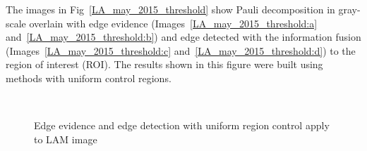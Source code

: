\documentclass[remotesensing,article,submit,pdftex,moreauthors]{Definitions/mdpi}
\begin{document}
The images in Fig~\eqref{LA_may_2015_threshold} show Pauli decomposition in gray-scale overlain     
with edge evidence (Images~\eqref{LA_may_2015_threshold:a} and~\eqref{LA_may_2015_threshold:b}) and edge detected with the information fusion (Images~\eqref{LA_may_2015_threshold:c} and~\eqref{LA_may_2015_threshold:d}) to the region of interest (ROI). The results shown in this figure were built using methods with uniform control regions.
  \begin{figure}[hbt]
	\centering
     \\
     \caption{Edge evidence and edge detection with uniform region control apply to LAM image}
     \label{LA_may_2015_threshold} 
   \end{figure}   
\end{document}
